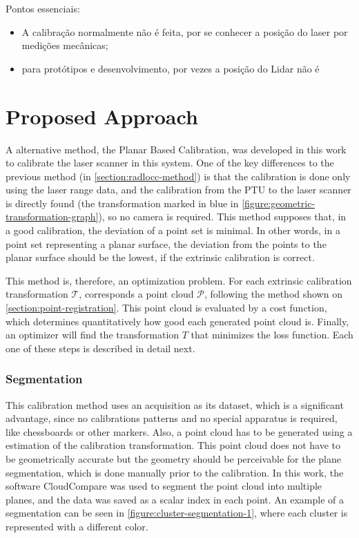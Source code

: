 \documentclass[conference]{IEEEtran}
\begin{document}
Pontos essenciais:
\begin{itemize}
    \item A calibração normalmente não é feita, por se conhecer a posição do laser por medições mecânicas;
    \item para protótipos e desenvolvimento, por vezes a posição do Lidar não é 
\end{itemize}


\section{Proposed Approach}\label{sec:proposed_approach}

A alternative method, the Planar Based Calibration, was developed in this work to calibrate the laser scanner in this system. One of the key differences to the previous method (in \cref{section:radlocc-method}) is that the calibration is done only using the laser range data, and the calibration from the PTU to the laser scanner is directly found (the transformation marked in blue in \cref{figure:geometric-transformation-graph}), so no camera is required. This method supposes that, in a good calibration, the deviation of a point set is minimal. In other words, in a point set representing a planar surface, the deviation from the points to the planar surface should be the lowest, if the extrinsic calibration is correct.

This method is, therefore, an optimization problem. For each extrinsic calibration transformation $\mathcal{T}$, corresponds a point cloud $\mathcal{P}$, following the method shown on \cref{section:point-registration}. This point cloud is evaluated by a cost function, which determines quantitatively how good each generated point cloud is. Finally, an optimizer will find the transformation $T$ that minimizes the loss function. Each one of these steps is described in detail next.

\subsubsection{Segmentation}

This calibration method uses an acquisition as its dataset, which is a significant advantage, since no calibrations patterns and no special apparatus is required, like chessboards or other markers. Also, a point cloud has to be generated using a estimation of the calibration transformation. This point cloud does not have to be geometrically accurate but the geometry should be perceivable for the plane segmentation, which is done manually prior to the calibration. In this work, the software CloudCompare was used to segment the point cloud into multiple planes, and the data was saved as a scalar index in each point. An example of a segmentation can be seen in \cref{figure:cluster-segmentation-1}, where each cluster is represented with a different color.
\end{document}
